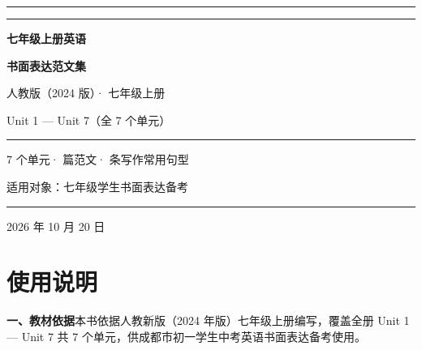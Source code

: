 \documentclass[UTF8,a4paper,11pt,oneside]{ctexbook}
\begin{document}
\linespread{1.32}\selectfont

\begin{titlepage}
  \thispagestyle{empty}
  \centering
  \vspace*{1.4cm}
  {\color{mainblue}\rule{\linewidth}{1.8pt}}\par
  \vspace{0.55cm}
  {\color{rulelight}\rule{\linewidth}{0.6pt}}\par
  \vspace{1.5cm}
  {\sffamily\bfseries\fontsize{36pt}{46pt}\selectfont\color{mainblue} 七年级上册英语\par}
  \vspace{0.35cm}
  {\sffamily\bfseries\fontsize{36pt}{46pt}\selectfont\color{mainblue} 书面表达范文集\par}
  \vspace{1.3cm}
  {\sffamily\fontsize{15pt}{21pt}\selectfont\color{accent} 人教版（2024 版）· 七年级上册\par}
  \vspace{0.3cm}
  {\sffamily\Large\color{mainblue} Unit 1 — Unit 7（全 7 个单元）\par}
  \vspace{1.0cm}
  {\color{accent}\rule{0.62\linewidth}{0.8pt}}\par
  \vspace{0.9cm}
  {\sffamily\large\color{textgray} 7 个单元\quad· 篇范文\quad· 条写作常用句型\par}
  \vfill
  {\large\sffamily 适用对象：七年级学生\quad 书面表达备考\par}
  \vspace{0.9cm}
  {\color{rulelight}\rule{0.62\linewidth}{0.6pt}}\par
  \vspace{0.5cm}
  {\sffamily\normalsize\color{textgray} 2026 年 10 月 20 日\par}
  \vspace*{0.6cm}
\end{titlepage}

\frontmatter
\pagestyle{plain}

\chapter*{使用说明}
{}

\noindent\textbf{一、教材依据}\quad 本书依据人教新版（2024 年版）七年级上册编写，覆盖全册
Unit 1 — Unit 7 共 7 个单元，供成都市初一学生中考英语书面表达备考使用。
\end{document}
